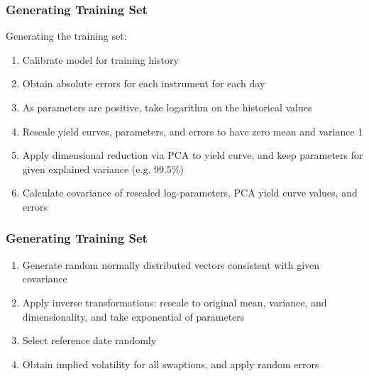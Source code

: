 \documentclass[bigger]{beamer}
\newcounter{saveenumi}
\newcommand{\seti}{\setcounter{saveenumi}{\value{enumi}}}
\newcommand{\conti}{\setcounter{enumi}{\value{saveenumi}}}
\begin{document}
\begin{frame}
\frametitle{Generating Training Set}
  \justifying
Generating the training set:
\begin{enumerate}
\item Calibrate model for training history
\item Obtain absolute errors for each instrument for each day
\item As parameters are positive, take logarithm on the historical values
\item Rescale yield curves, parameters, and errors to have zero mean and variance 1
\item Apply dimensional reduction via PCA to yield curve, and keep parameters for given explained variance (e.g. 99.5\%)
\item Calculate covariance of rescaled log-parameters, PCA yield curve values, and errors
\seti
\end{enumerate} 
\end{frame}

\begin{frame}
\frametitle{Generating Training Set}
  \justifying
\begin{enumerate}
\conti
\item Generate random normally distributed vectors consistent with given covariance
\item Apply inverse transformations: rescale to original mean, variance, and dimensionality, and take exponential of parameters
\item Select reference date randomly
\item Obtain implied volatility for all swaptions, and apply random errors
\end{enumerate} 
\end{frame}
\end{document}
